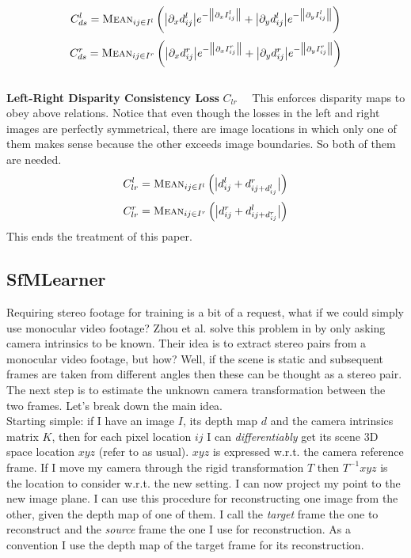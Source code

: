 \[
	C_{ds}^{l} = \textsc{Mean}_{ij \in I^{l}}
		\left(
			\big| \partial_{x} d^{l}_{ij} \big| e^{-\big\| \partial_{x} I^{l}_{ij} \big\| } + 
			\big| \partial_{y} d^{l}_{ij} \big| e^{-\big\| \partial_{y} I^{l}_{ij} \big\| }
		\right)
\]\[
	C_{ds}^{r} = \textsc{Mean}_{ij \in I^{r}}
		\left(
			\big| \partial_{x} d^{r}_{ij} \big| e^{-\big\| \partial_{x} I^{r}_{ij} \big\| } + 
			\big| \partial_{y} d^{r}_{ij} \big| e^{-\big\| \partial_{y} I^{r}_{ij} \big\| }
		\right)
\]
\\
\textbf{Left-Right Disparity Consistency Loss} $C_{lr} \quad$ This enforces disparity maps to obey above relations. Notice that even though the losses in the left and right images are perfectly symmetrical, there are image locations in which only one of them makes sense because the other exceeds image boundaries. So both of them are needed.
\[
	C_{lr}^{l} = \textsc{Mean}_{ij \in I^{l}}
		\left(
			\big| d^{l}_{ij} + d^{r}_{ij + d^{l}_{ij}} \big|
		\right)
\]\[
	C_{lr}^{r} = \textsc{Mean}_{ij \in I^{r}}
		\left(
			\big| d^{r}_{ij} + d^{l}_{ij + d^{r}_{ij}} \big|
		\right)
\]
This ends the treatment of this paper.

\subsection{SfMLearner}
Requiring stereo footage for training is a bit of a request, what if we could simply use monocular video footage? Zhou et al. solve this problem in \cite{SfMLearner} by only asking camera intrinsics to be known. Their idea is to extract stereo pairs from a monocular video footage, but how? Well, if the scene is static and subsequent frames are taken from different angles then these can be thought as a stereo pair. The next step is to estimate the unknown camera transformation between the two frames. Let's break down the main idea.\\
Starting simple: if I have an image $I$, its depth map $d$ and the camera intrinsics matrix $K$, then for each pixel location $ij$ I can \textit{differentiably} get its scene 3D space location $xyz$ (refer to \cite{multiview} as usual). $xyz$ is expressed w.r.t. the camera reference frame. If I move my camera through the rigid transformation $T$ then $T^{-1} xyz$ is the location to consider w.r.t. the new setting. I can now project my point to the new image plane. I can use this procedure for reconstructing one image from the other, given the depth map of one of them. I call the \textit{target} frame the one to reconstruct and the \textit{source} frame the one I use for reconstruction. As a convention I use the depth map of the target frame for its reconstruction.\\

